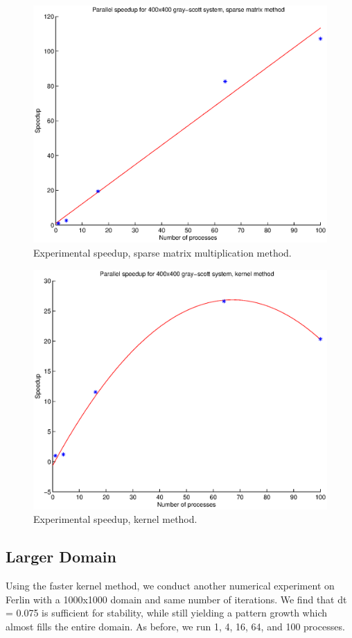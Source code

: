 \documentclass[a4paper,11pt]{article}
\begin{document}
\begin{figure}
  \centering
  \includegraphics[scale=0.6]{sparse}
    \caption{Experimental speedup, sparse matrix multiplication method.}
    \label{fig:sparse}
\end{figure}

\begin{figure}
  \centering
  \includegraphics[scale=0.6]{kernel}
    \caption{Experimental speedup, kernel method.}
    \label{fig:kernel}
\end{figure}

\subsection*{Larger Domain}
Using the faster kernel method, we conduct another numerical experiment on Ferlin with a 1000x1000 domain and same number of iterations. We find that dt = 0.075 is sufficient for stability, while still yielding a pattern growth which almost fills the entire domain. As before, we run 1, 4, 16, 64, and 100 processes. 
\end{document}
